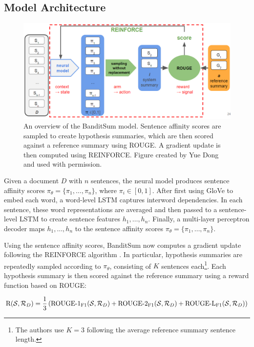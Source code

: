 \subsection{Model Architecture}
\begin{figure}[h]
    \centering
    \includegraphics[width=0.9\linewidth]{fig/bsum_architecture.png}
    \caption[An overview of the BanditSum model.]{An overview of the BanditSum model. Sentence affinity scores are sampled to create hypothesis summaries, which are then scored against a reference summary using ROUGE. A gradient update is then computed using REINFORCE. Figure created by Yue Dong and used with permission.}
    \label{fig:bsum_architecture}
\end{figure}

Given a document $D$ with $n$ sentences, the neural model produces sentence affinity scores $\pi_\theta = \{ \pi_1,\dots,\pi_n \}$, where $\pi_i \in [0, 1]$.
After first using GloVe \parencite{we2_pennington2014glove} to embed each word, a word-level LSTM captures interword dependencies. In each sentence, these word representations are averaged and then passed to a sentence-level LSTM to create sentence features $h_1,\dots,h_n$. Finally, a multi-layer perceptron decoder maps $h_1,\dots,h_n$ to the sentence affinity scores $\pi_\theta = \{\pi_1,\dots,\pi_n \}$.

Using the sentence affinity scores, BanditSum now computes a gradient update following the REINFORCE algorithm \parencite{williams1992simple}. In particular, hypothesis summaries are repeatedly sampled according to $\pi_\theta$, consisting of $K$ sentences each\footnote{The authors use $K = 3$ following the average reference summary sentence length.}. Each hypothesis summary is then scored against the reference summary using a reward function based on ROUGE:

\begin{equation}
    \mathrm{R}(\mathcal{S}, \mathcal{R}_D) = \frac{1}{3}\left( \operatorname{ROUGE-1_{F1}}(\mathcal{S}, \mathcal{R}_D) + \operatorname{ROUGE-2_{F1}}(\mathcal{S}, \mathcal{R}_D) + \operatorname{ROUGE-L_{F1}}(\mathcal{S}, \mathcal{R}_D) \right)
\end{equation}

